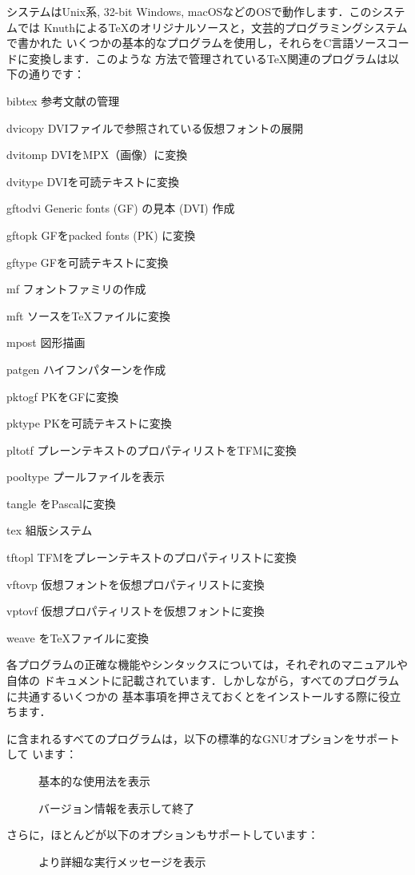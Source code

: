 \documentclass[uplatex,dvipdfmx,tombow]{jsarticle}
\begin{document}
\Webc システムはUnix系, 32-bit Windows, macOSなどのOSで動作します．このシステムでは
Knuthによる\TeX のオリジナルソースと，文芸的プログラミングシステム\WEB で書かれた
いくつかの基本的なプログラムを使用し，それらをC言語ソースコードに変換します．このような
方法で管理されている\TeX 関連のプログラムは以下の通りです：
%
\begin{cmddescription}
\item[bibtex] 参考文献の管理
\item[dvicopy] DVIファイルで参照されている仮想フォントの展開
\item[dvitomp] DVIをMPX（\MP 画像）に変換
\item[dvitype] DVIを可読テキストに変換
\item[gftodvi] Generic fonts (GF) の見本 (DVI) 作成
\item[gftopk] GFをpacked fonts (PK) に変換
\item[gftype] GFを可読テキストに変換
\item[mf] フォントファミリの作成
\item[mft] \MF ソースを\TeX ファイルに変換
\item[mpost] 図形描画
\item[patgen] ハイフンパターンを作成
\item[pktogf] PKをGFに変換
\item[pktype] PKを可読テキストに変換
\item[pltotf] プレーンテキストのプロパティリストをTFMに変換
\item[pooltype] \WEB プールファイルを表示
\item[tangle] \WEB をPascalに変換
\item[tex] 組版システム
\item[tftopl] TFMをプレーンテキストのプロパティリストに変換
\item[vftovp] 仮想フォントを仮想プロパティリストに変換
\item[vptovf] 仮想プロパティリストを仮想フォントに変換
\item[weave] \WEB を\TeX ファイルに変換
\end{cmddescription}
%
各プログラムの正確な機能やシンタックスについては，それぞれのマニュアルや\Webc 自体の
ドキュメントに記載されています．しかしながら，すべてのプログラムに共通するいくつかの
基本事項を押さえておくと\Webc をインストールする際に役立ちます．

\Webc に含まれるすべてのプログラムは，以下の標準的なGNUオプションをサポートして
います：
%
\begin{description}
\item[] 基本的な使用法を表示
\item[] バージョン情報を表示して終了
\end{description}
%
さらに，ほとんどが以下のオプションもサポートしています：
%
\begin{description}
\item[] より詳細な実行メッセージを表示
\end{description}
\end{document}
